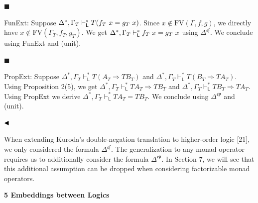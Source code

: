 \documentclass[10pt,a4paper]{article}
\begin{document}
\par\noindent  $\blacksquare$ 
 
FunExt: Suppose $\Delta^{*},\Gamma_{T}\vdash_{\mathsf{L}}^{*}T(f_{T}\leavevmode\nobreak\ x=g_{T}\leavevmode\nobreak\ x)$. Since $x\notin\text{{FV}}(\Gamma,f,g)$, we directly have $x\notin\text{{FV}}(\Gamma_{T},f_{T},g_{T})$. We get $\Delta^{*},\Gamma_{T}\vdash_{\mathsf{L}}^{*}f_{T}\leavevmode\nobreak\ x=g_{T}\leavevmode\nobreak\ x$ using $\Delta^{\mathfrak{e}\mathfrak{f}}$. We conclude using FunExt and (unit).\par
 
 
 
\par\noindent  $\blacksquare$ 
 
PropExt: Suppose $\Delta^{*},\Gamma_{T}\vdash_{\mathsf{L}}^{*}T(A_{T}\mathbin{\Rightarrow}TB_{T})$ and $\Delta^{*},\Gamma_{T}\vdash_{\mathsf{L}}^{*}T(B_{T}\mathbin{\Rightarrow}TA_{T})$. Using Proposition 2(5), we get $\Delta^{*},\Gamma_{T}\vdash_{\mathsf{L}}^{*}TA_{T}\mathbin{\Rightarrow}TB_{T}$ and $\Delta^{*},\Gamma_{T}\vdash_{\mathsf{L}}^{*}TB_{T}\mathbin{\Rightarrow}TA_{T}$. Using PropExt we derive $\Delta^{*},\Gamma_{T}\vdash_{\mathsf{L}}^{*}TA_{T}=TB_{T}$. We conclude using $\Delta^{\mathfrak{e}\mathfrak{p}}$ and (unit).\par
 
 
  
$\hfill\blacktriangleleft$\par
 
 
 
When extending Kuroda’s double-negation translation to higher-order logic [21], we only considered the formula $\Delta^{\mathfrak{e}\mathfrak{f}}$. The generalization to any monad operator requires us to additionally consider the formula $\Delta^{\mathfrak{e}\mathfrak{p}}$. In Section 7, we will see that this additional assumption can be dropped when considering factorizable monad operators.\par
 
 
 


 
\par\medskip\noindent\textbf{5 Embeddings between Logics}\par
 
\end{document}
